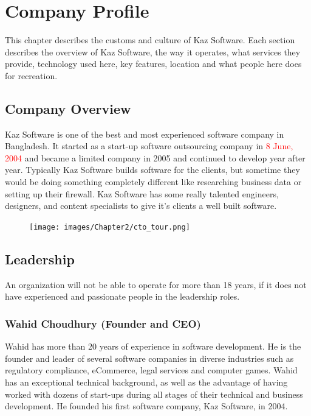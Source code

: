 \chapter{Company Profile}

This chapter describes the customs and culture of Kaz Software.
Each section describes the overview of Kaz Software, the way it operates, what services they provide, technology used here, key features, location and what people here does for recreation. 

\section{Company Overview}

Kaz Software is one of the best and most experienced software company in Bangladesh.
It started as a start-up software outsourcing company in \textcolor{red}{8 June, 2004} and became a limited company in 2005 and continued to develop year after year.
Typically Kaz Software builds software for the clients, but sometime they would be doing something completely different like researching business data or setting up their firewall.
Kaz Software has some really talented engineers, designers, and content specialists to give it's clients a well built software.

\begin{figure}[h]
    \begin{center}
        \texttt{[image: images/Chapter2/cto\_tour.png]}
        \label{fig:CTO_Tour}
    \end{center}
\end{figure}

\section{Leadership}

An organization will not be able to operate for more than 18 years, if it does not have experienced and passionate people in the leadership roles.

\subsection[Founder and CEO]{Wahid Choudhury (Founder and CEO)}

Wahid has more than 20 years of experience in software development.
He is the founder and leader of several software companies in diverse industries such as regulatory compliance, eCommerce, legal services and computer games. 
Wahid has an exceptional technical background, as well as the advantage of having worked with dozens of start-ups during all stages of their technical and business development. He founded his first software company, Kaz Software, in 2004.


